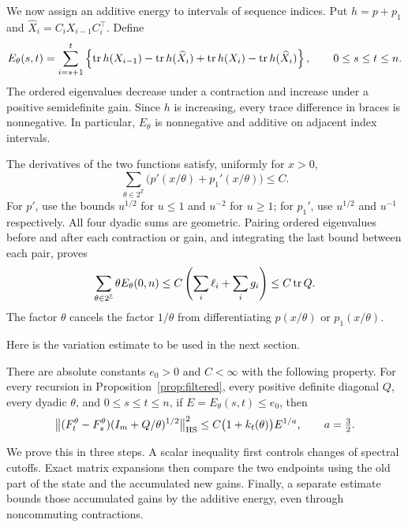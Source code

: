 We now assign an additive energy to intervals of sequence indices.
Put $h=p+p_1$ and $\widehat X_i=C_iX_{i-1}C_i^\top$.  Define
\begin{equation}
 E_\theta(s,t)=\sum_{i=s+1}^t
 \left\{
   \operatorname{tr} h(X_{i-1})-\operatorname{tr} h(\widehat X_i)
   +\operatorname{tr} h(X_i)-\operatorname{tr} h(\widehat X_i)
 \right\},
 \qquad 0\le s\le t\le n.
 \label{eq:energy-definition}
\end{equation}
The ordered eigenvalues decrease under a contraction and increase
under a positive semidefinite gain.  Since $h$ is increasing, every
trace difference in braces is nonnegative.  In particular,
$E_\theta$ is nonnegative and additive on adjacent index intervals.

The derivatives of the two functions satisfy, uniformly for $x>0$,
\[
 \sum_{\theta\in2^{\mathbb Z}}
   \bigl(p'(x/\theta)+p_1'(x/\theta)\bigr)\le C.
\]
For $p'$, use the bounds $u^{1/2}$ for $u\le1$ and $u^{-2}$ for
$u\ge1$; for $p_1'$, use $u^{1/2}$ and $u^{-1}$ respectively.
All four dyadic sums are geometric.  Pairing ordered eigenvalues
before and after each contraction or gain, and integrating the last
bound between each pair, proves
\begin{equation}
 \sum_{\theta\in2^{\mathbb Z}}\theta E_\theta(0,n)
   \le C\left(\sum_i\ell_i+\sum_i g_i\right)
   \le C\operatorname{tr} Q.
 \label{eq:scale-energy}
\end{equation}
The factor $\theta$ cancels the factor $1/\theta$ from differentiating
$p(x/\theta)$ or $p_1(x/\theta)$.

Here is the variation estimate to be used in the next section.

\begin{lemma}
\label{lem:increment}
There are absolute constants $e_0>0$ and $C<\infty$ with the following
property.  For every recursion in Proposition~\ref{prop:filtered},
every positive definite diagonal $Q$, every dyadic $\theta$, and
$0\le s\le t\le n$, if $E=E_\theta(s,t)\le e_0$, then
\begin{equation}
 \bigl\lVert(F_t^\theta-F_s^\theta)
          (I_m+Q/\theta)^{1/2}\bigr\rVert_{\mathrm{HS}}^2
   \le C\bigl(1+k_t(\theta)\bigr)E^{1/a},
 \qquad a=\tfrac32.
 \label{eq:increment}
\end{equation}
\end{lemma}

We prove this in three steps.  A scalar inequality first controls
changes of spectral cutoffs.  Exact matrix expansions then compare
the two endpoints using the old part of the state and the accumulated
new gains.  Finally, a separate estimate bounds those accumulated
gains by the additive energy, even through noncommuting contractions.

